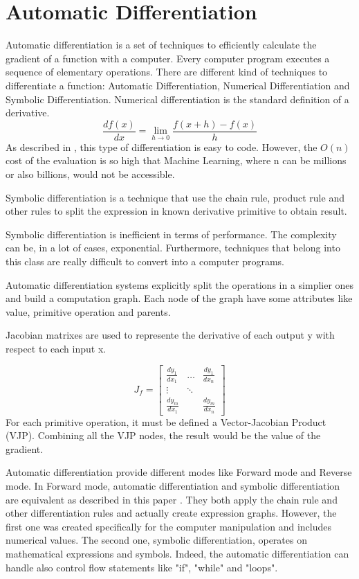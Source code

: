 \documentclass[12pt]{report}
\begin{document}
\section{Automatic Differentiation}
Automatic differentiation is a set of techniques to efficiently calculate the gradient of a function with a computer.
Every computer program executes a sequence of elementary operations.
There are different kind of techniques to differentiate a function: Automatic Differentiation, Numerical Differentiation and Symbolic Differentiation.
Numerical differentiation is the standard definition of a derivative.
\begin{equation}
    \frac{df(x)}{dx} = \lim_{h \to 0} \frac{f(x+h) - f(x)}{h}
\end{equation}
%
As described in \cite{autodiff}, this type of differentiation is easy to code.
However, the $O(n)$ cost of the evaluation is so high
that Machine Learning, where n can be millions or also billions, would not be accessible.

Symbolic differentiation is a technique that use the chain rule, product rule and other rules to 
split the expression in known derivative primitive to obtain result.

Symbolic differentiation is inefficient in terms of performance. The complexity can be, in a lot of cases, exponential.
Furthermore, techniques that belong into this class are really difficult to convert into a computer programs.

Automatic differentiation systems explicitly split the operations in a simplier ones and build a computation graph.
Each node of the graph have some attributes like value, primitive operation and parents.

Jacobian matrixes are used to represente the derivative of each output y with respect to each input x.

\begin{equation}
    J_f = \begin{bmatrix} 
        \frac{dy_1}{dx_1} & \dots & \frac{dy_1}{dx_n} \\
        \vdots & \ddots & \\
        \frac{dy_m}{dx_1} &        & \frac{dy_m}{dx_n}
        \end{bmatrix}
\end{equation}
%
For each primitive operation, it must be defined a Vector-Jacobian Product (VJP). 
Combining all the VJP nodes, the result would be the value of the gradient.

Automatic differentiation provide different modes like Forward mode and Reverse mode.
In Forward mode, automatic differentiation and symbolic differentiation are equivalent as described in this paper \cite{auto_symbol}.
They both apply the chain rule and other differentiation rules and actually create expression graphs.
However, the first one was created specifically for the computer manipulation and includes numerical values. 
The second one, symbolic differentiation, operates on mathematical expressions and symbols.
Indeed, the automatic differentiation can handle also control flow statements like "if", "while" and "loops".
\end{document}
